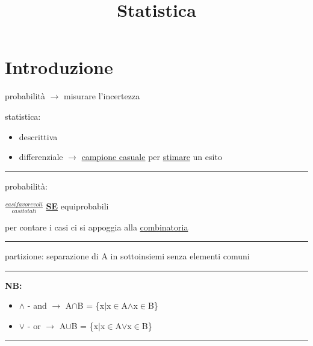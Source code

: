 \documentclass[12pt, letterpaper]{article}
\title{Statistica}
\date{}
\author{}
\begin{document}
\section{Introduzione}

probabilità $\rightarrow$ misurare l'incertezza

statistica:
\begin{itemize}
    \item descrittiva
    \item differenziale $\rightarrow$  \underline{campione casuale} per \underline{stimare} un esito
\end{itemize}

\begin{center}
    \rule{100pt}{0.5pt}
\end{center}

probabilità:  
\begin{center}
    $\frac{casi favorevoli}{casi totali}$
\textbf{\underline{SE}} equiprobabili
\end{center}

per contare i casi ci si appoggia alla \underline{combinatoria}

\begin{center}
    \rule{100pt}{0.5pt}
\end{center}

partizione: separazione di A in sottoinsiemi senza elementi comuni

\begin{center}
    \rule{100pt}{0.5pt}
\end{center}

\textbf{NB:} 
\begin{itemize}
    \item $\wedge$ - and $\rightarrow$ A$\cap$B = \{x$|$x$\in$A$\wedge$x$\in$B\}
    \item $\vee$ - or $\rightarrow$ A$\cup$B = \{x$|$x$\in$A$\vee$x$\in$B\}
\end{itemize} 

\begin{center}
    \rule{100pt}{0.5pt}
\end{center}
\end{document}
